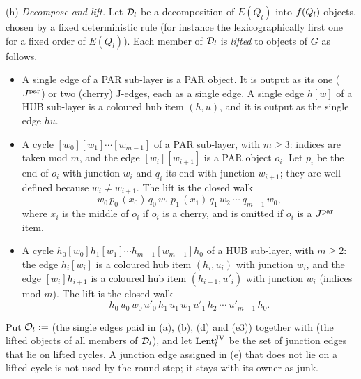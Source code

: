 \begin{construction}
\smallskip\noindent
(h) \emph{Decompose and lift.} Let $\mathcal{D}_l$ be a decomposition of $E(Q_l)$ into
$f(Q_l)$ objects, chosen by a fixed deterministic rule (for instance the
lexicographically first one for a fixed order of $E(Q_l)$). Each member of
$\mathcal{D}_l$ is \emph{lifted} to objects of $G$ as follows.
\begin{itemize}
\item A single edge of a PAR sub-layer is a PAR object. It is output as its one
($J^{\mathrm{par}}$) or two (cherry) J-edges, each as a single edge. A single edge $h[w]$ of
a HUB sub-layer is a coloured hub item $(h,u)$, and it is output as the single
edge $hu$.
\item A cycle $[w_0][w_1]\cdots[w_{m-1}]$ of a PAR sub-layer, with $m\ge3$:
indices are taken mod $m$, and the edge $[w_i][w_{i+1}]$ is a PAR object $o_i$.
Let $p_i$ be the end of $o_i$ with junction $w_i$ and $q_i$ its end with junction
$w_{i+1}$; they are well defined because $w_i\ne w_{i+1}$. The lift is the closed
walk
\[
w_0\,p_0\,(x_0)\,q_0\,w_1\,p_1\,(x_1)\,q_1\,w_2\ \cdots\ q_{m-1}\,w_0 ,
\]
where $x_i$ is the middle of $o_i$ if $o_i$ is a cherry, and is omitted if $o_i$
is a $J^{\mathrm{par}}$ item.
\item A cycle $h_0[w_0]h_1[w_1]\cdots h_{m-1}[w_{m-1}]h_0$ of a HUB sub-layer,
with $m\ge2$: the edge $h_i[w_i]$ is a coloured hub item $(h_i,u_i)$ with
junction $w_i$, and the edge $[w_i]h_{i+1}$ is a coloured hub item
$(h_{i+1},u'_i)$ with junction $w_i$ (indices mod $m$). The lift is the closed
walk
\[
h_0\,u_0\,w_0\,u'_0\,h_1\,u_1\,w_1\,u'_1\,h_2\ \cdots\ u'_{m-1}\,h_0 .
\]
\end{itemize}
Put $\mathcal{O}_l\mathrel{:=}{}$(the single edges paid in (a), (b), (d) and (e3)) together
with (the lifted objects of all members of $\mathcal{D}_l$), and let $\mathrm{Lent}^{\mathrm{JV}}_l$ be the
set of junction edges that lie on lifted cycles. A junction edge assigned in (e)
that does not lie on a lifted cycle is not used by the round step; it stays with
its owner as junk.
\deps{\ref{s6:lemJplus}, \ref{s6:defJconsumer}, \ref{s7:defCand}, \ref{s7:defPool}, \ref{s7:defSchedule}, \ref{s1:citMarkov}}
\end{construction}

